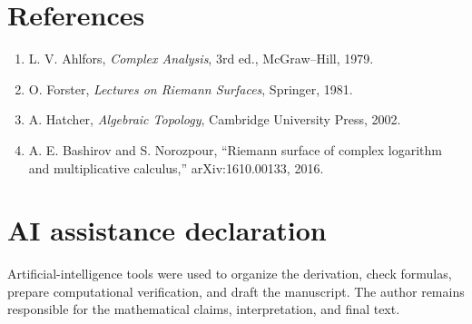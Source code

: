 \documentclass[11pt]{article}
\begin{document}
\section*{References}
\begin{enumerate}
\item L. V. Ahlfors, \emph{Complex Analysis}, 3rd ed., McGraw--Hill, 1979.
\item O. Forster, \emph{Lectures on Riemann Surfaces}, Springer, 1981.
\item A. Hatcher, \emph{Algebraic Topology}, Cambridge University Press, 2002.
\item A. E. Bashirov and S. Norozpour, ``Riemann surface of complex logarithm and multiplicative calculus,'' arXiv:1610.00133, 2016.
\end{enumerate}

\section*{AI assistance declaration}
Artificial-intelligence tools were used to organize the derivation, check formulas, prepare computational verification, and draft the manuscript.  The author remains responsible for the mathematical claims, interpretation, and final text.
\end{document}
